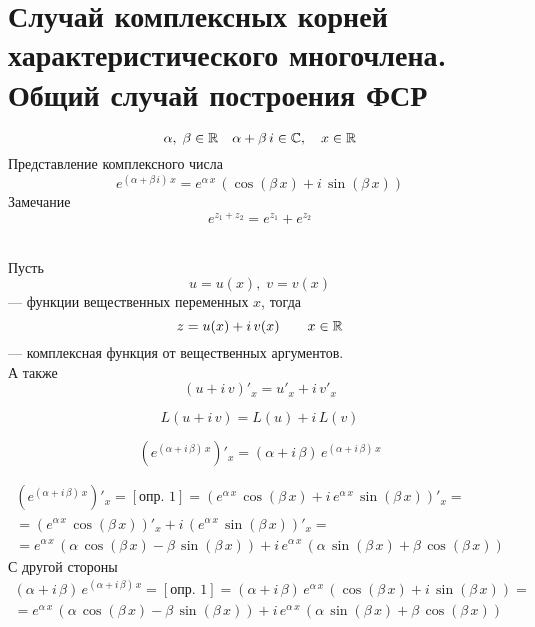 \author{Tkachuk Andrei}

\section{Случай комплексных корней характеристического многочлена. Общий случай построения ФСР}

\begin{Def}
    \[
        \alpha,\; \beta \in \mathbb{R} \quad \alpha + \beta\,i \in \mathbb{C}, \quad x\in\mathbb{R}
    \]
    Представление комплексного числа 
    \[
        e^{(\alpha + \beta\,i)\,x} = e^{\alpha\,x}\,(\cos(\beta\,x) + i\,\sin(\beta\,x))
    \]
    Замечание
    \[
        e^{z_1 + z_2} = e^{z_1} + e^{z_2}
    \]
\end{Def}

\begin{Def}~\\
    Пусть 
    \[
        u = u(x),\; v = v(x)
    \] 
    --- функции вещественных переменных $x$, тогда
    \[
        z = u(x) + i\,v(x) \qquad x\in\mathbb{R}
    \]
    --- комплексная функция от вещественных аргументов.\\
    А также
    \[
        (u + i\,v)'_x = u'_x + i\,v'_x
    \] 
\end{Def}

\begin{Note}
    \[
        L(u + i\,v) = L(u) + i\,L(v)
    \]  
\end{Note}

\begin{Note}
    \[
        (e^{(\alpha + i\,\beta)\,x})'_x = (\alpha + i\,\beta)\,e^{(\alpha + i\,\beta)\,x}
    \]    
\end{Note}

\begin{Proof}
    \begin{gather*}
        (e^{(\alpha + i\,\beta)\,x})'_x = [\text{опр. 1}] = (e^{\alpha\,x}\,\cos(\beta\,x) + i\,e^{\alpha\,x}\,\sin(\beta\,x))'_x = \\
        = (e^{\alpha\,x}\,\cos(\beta\,x))'_x + i\,(e^{\alpha\,x}\,\sin(\beta\,x))'_x =\\
        = e^{\alpha\,x}\,(\alpha\,\cos(\beta\,x) - \beta\,\sin(\beta\,x)) + i\,e^{\alpha\,x}\,(\alpha\,\sin(\beta\,x) + \beta\,\cos(\beta\,x))
    \end{gather*}
    С другой стороны
    \begin{gather*}
        (\alpha + i\,\beta)\,e^{(\alpha + i\,\beta)\,x} = [\text{опр. 1}] = (\alpha + i\,\beta)\,e^{\alpha\,x}\,(\cos(\beta\,x) + i\,\sin(\beta\,x)) =\\
        = e^{\alpha\,x}\,(\alpha\,\cos(\beta\,x) - \beta\,\sin(\beta\,x)) + i\,e^{\alpha\,x}\,(\alpha\,\sin(\beta\,x) + \beta\,\cos(\beta\,x)) 
    \end{gather*}
\end{Proof}

